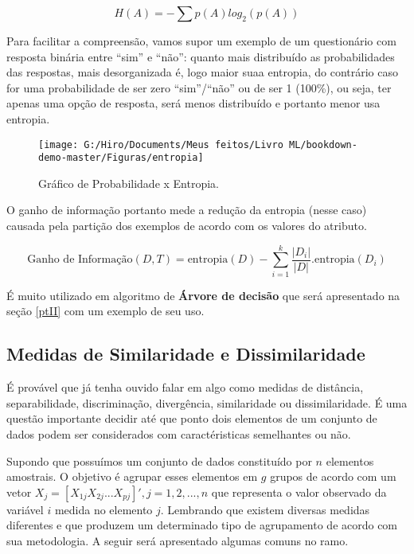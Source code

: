 \documentclass[
  openany]{book}
\begin{document}
\begin{equation} 
  H(A)=- \sum p(A)log_2(p(A)) 
  \label{eq:entropia}
\end{equation}

Para facilitar a compreensão, vamos supor um exemplo de um questionário com resposta binária entre ``sim'' e ``não'': quanto mais distribuído as probabilidades das respostas, mais desorganizada é, logo maior suaa entropia, do contrário caso for uma probabilidade de ser zero ``sim''/``não'' ou de ser 1 (100\%), ou seja, ter apenas uma opção de resposta, será menos distribuído e portanto menor usa entropia.

\begin{figure}

{\centering \texttt{[image: G:/Hiro/Documents/Meus feitos/Livro ML/bookdown-demo-master/Figuras/entropia]} 

}

\caption{Gráfico de Probabilidade x Entropia.}\label{fig:entropia}
\end{figure}



O ganho de informação portanto mede a redução da entropia (nesse caso) causada pela partição dos exemplos de acordo com os valores do atributo.

\begin{equation} 
  \mbox{Ganho de Informação}(D,T)=\mbox{entropia}(D)-\displaystyle \sum_{i=1}^k \frac{|D_i|}{|D|}. \mbox{entropia}(D_i) 
  \label{eq:ganhodeinf}
\end{equation}

É muito utilizado em algoritmo de \textbf{Árvore de decisão} que será apresentado na seção \ref{ptII} com um exemplo de seu uso.

\hypertarget{meddist}{%
\subsection{Medidas de Similaridade e Dissimilaridade}\label{meddist}}

É provável que já tenha ouvido falar em algo como medidas de distância, separabilidade, discriminação, divergência, similaridade ou dissimilaridade. É uma questão importante decidir até que ponto dois elementos de um conjunto de dados podem ser considerados com caractéristicas semelhantes ou não.

Supondo que possuímos um conjunto de dados constituído por \(n\) elementos amostrais. O objetivo é agrupar esses elementos em \(g\) grupos de acordo com um vetor \(X_j=[X_{1j}X_{2j}...X_{pj}]', j=1,2,...,n\) que representa o valor observado da variável \(i\) medida no elemento \(j\). Lembrando que existem diversas medidas diferentes e que produzem um determinado tipo de agrupamento de acordo com sua metodologia. A seguir será apresentado algumas comuns no ramo.
\end{document}
